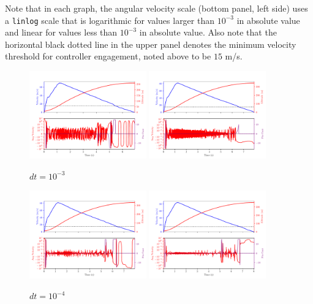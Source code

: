 \documentclass{amsdtx}
\begin{document}
Note that in each graph, the angular velocity scale (bottom panel, left side) uses a \verb|linlog| scale that is logarithmic for values larger than $10^{-3}$ in absolute value and linear for values less than $10^{-3}$ in absolute value. Also note that the horizontal black dotted line in the upper panel denotes the minimum velocity threshold for controller engagement, noted above to be $15$ m/s.
\begin{figure}[H]
\centering
\includegraphics[width=0.45\textwidth]{bib/figures_for_readme/RK4_dt_0p001.pdf}
\includegraphics[width=0.45\textwidth]{bib/figures_for_readme/RK6_dt_0p001.pdf}
\caption{$dt=10^{-3}$}
\end{figure}
\begin{figure}[H]
\centering
\includegraphics[width=0.45\textwidth]{bib/figures_for_readme/RK4_dt_0p0001.pdf}
\includegraphics[width=0.45\textwidth]{bib/figures_for_readme/RK6_dt_0p0001.pdf}
\caption{$dt=10^{-4}$}
\end{figure}
\end{document}
